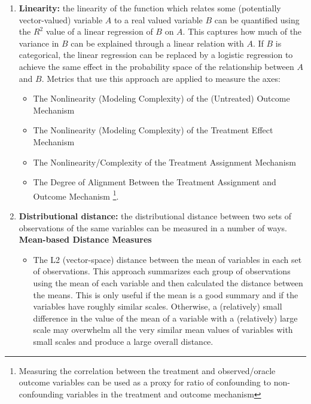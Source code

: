 \documentclass[../main.tex]{subfiles}
\begin{document}
\begin{enumerate}
    \item \textbf{Linearity:} the linearity of the function which relates some (potentially vector-valued) variable $A$ to a real valued variable $B$ can be quantified using the $R^2$ value of a linear regression of $B$ on $A$. This captures how much of the variance in $B$ can be explained through a linear relation with $A$. If $B$ is categorical, the linear regression can be replaced by a logistic regression to achieve the same effect in the probability space of the relationship between $A$ and $B$. Metrics that use this approach are applied to measure the axes:
    
    \begin{itemize}
        \item The Nonlinearity (Modeling Complexity) of the (Untreated) Outcome Mechanism
        \item The Nonlinearity (Modeling Complexity) of the Treatment Effect Mechanism
        \item The Nonlinearity/Complexity of the Treatment Assignment Mechanism
        \item The Degree of Alignment Between the Treatment Assignment and Outcome Mechanism \footnote{Measuring the correlation between the treatment and observed/oracle outcome variables can be used as a proxy for ratio of confounding to non-confounding variables in the treatment and outcome mechanism}.
    \end{itemize}
    
    \item \textbf{Distributional distance:} the distributional distance between two sets of observations of the same variables can be measured in a number of ways.
    \vspace{\baselineskip}
    \textbf{Mean-based Distance Measures}
    
    \begin{itemize}
        
        \item The L2 (vector-space) distance between the mean of variables in each set of observations. This approach summarizes each group of observations using the mean of each variable and then calculated the distance between the means. This is only useful if the mean is a good summary and if the variables have roughly similar scales. Otherwise, a (relatively) small difference in the value of the mean of a variable with a (relatively) large scale may overwhelm all the very similar mean values of variables with small scales and produce a large overall distance.
        

\end{itemize}
\end{enumerate}
\end{document}
